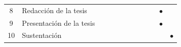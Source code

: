 \documentclass[12pt,a4paper]{article}
\begin{document}
\begin{table}[ht!]
\begin{tabular}{cp{6cm}cccccccccc}
		8                   & Redacción de la tesis             &                           &           &           &           &           &           &           &           & $\bullet$ &           \\
		9                   & Presentación de la tesis          &                           &           &           &           &           &           &           &           & $\bullet$ &           \\
		10                  & Sustentación                      &                           &           &           &           &           &           &           &           &           & $\bullet$ \\
		\bottomrule
	\end{tabular}
\end{table}
\end{document}
